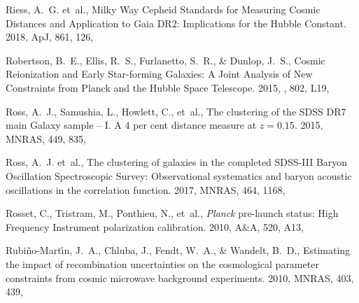\documentclass[longauth,traditabstract]{aa}
\def\aap{{A\&A}}
\def\apj{{ApJ}}
\def\mnras{{MNRAS}}
\begin{document}
\begin{thebibliography}{379}
Riess, A.~G. {et~al.}, {\providecommand{\mockalph}[1]{}\mockalph{b}Milky Way
  Cepheid Standards for Measuring Cosmic Distances and Application to Gaia DR2:
  Implications for the Hubble Constant}. 2018{}, \apj, 861, 126,

{Robertson}, B.~E., {Ellis}, R.~S., {Furlanetto}, S.~R., \& {Dunlop}, J.~S.,
  {Cosmic Reionization and Early Star-forming Galaxies: A Joint Analysis of New
  Constraints from Planck and the Hubble Space Telescope}. 2015, \apjl, 802,
  L19, 

Ross, A.~J., Samushia, L., Howlett, C., {et~al.}, {The clustering of the SDSS
  DR7 main Galaxy sample – I. A 4 per cent distance measure at $z = 0.15$}.
  2015, \mnras, 449, 835, 

Ross, A.~J. {et~al.}, {The clustering of galaxies in the completed SDSS-III
  Baryon Oscillation Spectroscopic Survey: Observational systematics and baryon
  acoustic oscillations in the correlation function}. 2017, \mnras, 464, 1168,

{Rosset}, C., {Tristram}, M., {Ponthieu}, N., {et~al.}, {\textit{Planck}
  pre-launch status: High Frequency Instrument polarization calibration}. 2010,
  \aap, 520, A13, 

{Rubi{\~n}o-Mart{\'{\i}}n}, J.~A., {Chluba}, J., {Fendt}, W.~A., \& {Wandelt},
  B.~D., {Estimating the impact of recombination uncertainties on the
  cosmological parameter constraints from cosmic microwave background
  experiments}. 2010, \mnras, 403, 439, 


\end{thebibliography}
\end{document}
